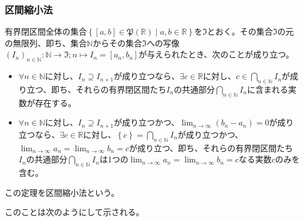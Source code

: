 \documentclass[dvipdfmx]{jsarticle}
\begin{document}
\subsubsection{区間縮小法}%
\begin{thm}[区間縮小法]\label{4.1.5.6}
有界閉区間全体の集合$\left\{ [ a,b]\in \mathfrak{P}\left( \mathbb{R} \right) \middle| a,b \in \mathbb{R} \right\}$を$\mathfrak{I}$とおく。その集合$\mathfrak{I}$の元の無限列、即ち、集合$\mathbb{N}$からその集合$\mathfrak{I}$への写像$\left( I_{n} \right)_{n \in \mathbb{N}}:\mathbb{N}\mathfrak{\rightarrow I;}n \mapsto I_{n} = \left[ a_{n},b_{n} \right]$が与えられたとき、次のことが成り立つ。
\begin{itemize}
\item
  $\forall n \in \mathbb{N}$に対し、$I_{n} \supseteq I_{n + 1}$が成り立つなら、$\exists c \in \mathbb{R}$に対し、$c \in \bigcap_{n \in \mathbb{N}}I_{n}$が成り立つ、即ち、それらの有界閉区間たち$I_{n}$の共通部分$\bigcap_{n \in \mathbb{N}}I_{n}$に含まれる実数が存在する。
\item
  $\forall n \in \mathbb{N}$に対し、$I_{n} \supseteq I_{n + 1}$が成り立つかつ、$\lim_{n \rightarrow \infty}\left( b_{n} - a_{n} \right) = 0$が成り立つなら、$\exists c \in \mathbb{R}$に対し、$\left\{ c \right\} = \bigcap_{n \in \mathbb{N}}I_{n}$が成り立つかつ、$\lim_{n \rightarrow \infty}a_{n} = \lim_{n \rightarrow \infty}b_{n} = c$が成り立つ、即ち、それらの有界閉区間たち$I_{n}$の共通部分$\bigcap_{n \in \mathbb{N}}I_{n}$は1つの$\lim_{n \rightarrow \infty}a_{n} = \lim_{n \rightarrow \infty}b_{n} = c$なる実数$c$のみを含む。
\end{itemize}
この定理を区間縮小法という。
\end{thm}\par
このことは次のようにして示される。
\end{document}
